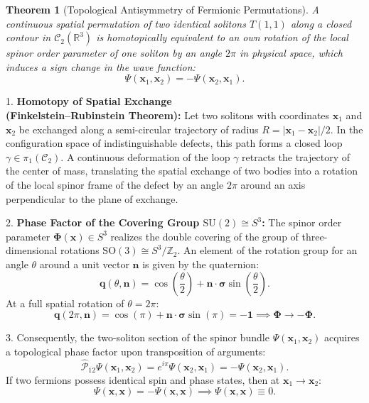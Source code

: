 \documentclass[12pt,a4paper]{article}
\newtheorem{theorem}{Theorem}
\newtheorem{corollary}{Corollary}
\begin{document}
	\begin{theorem}[Topological Antisymmetry of Fermionic Permutations]
	A continuous spatial permutation of two identical solitons $T(1,1)$ along a closed contour in $\mathcal{C}_2(\mathbb{R}^3)$ is homotopically equivalent to an own rotation of the local spinor order parameter of one soliton by an angle $2\pi$ in physical space, which induces a sign change in the wave function:
	\begin{equation}
	\Psi(\mathbf{x}_1, \mathbf{x}_2) = -\Psi(\mathbf{x}_2, \mathbf{x}_1).
	\end{equation}
	\end{theorem}
								
	1. \textbf{Homotopy of Spatial Exchange\\ (Finkelstein--Rubinstein Theorem):}
	Let two solitons with coordinates $\mathbf{x}_1$ and $\mathbf{x}_2$ be exchanged along a semi-circular trajectory of radius $R = |\mathbf{x}_1 - \mathbf{x}_2| / 2$. In the configuration space of indistinguishable defects, this path forms a closed loop $\gamma \in \pi_1(\mathcal{C}_2)$. 
	A continuous deformation of the loop $\gamma$ retracts the trajectory of the center of mass, translating the spatial exchange of two bodies into a rotation of the local spinor frame of the defect by an angle $2\pi$ around an axis perpendicular to the plane of exchange.
									
	2. \textbf{Phase Factor of the Covering Group $\mathrm{SU}(2) \cong S^3$:}
	The spinor order parameter $\boldsymbol{\Phi}(\mathbf{x}) \in S^3$ realizes the double covering of the group of three-dimensional rotations $\mathrm{SO}(3) \cong S^3 / \mathbb{Z}_2$. An element of the rotation group for an angle $\theta$ around a unit vector $\mathbf{n}$ is given by the quaternion:
	\begin{equation}
	\mathbf{q}(\theta, \mathbf{n}) = \cos\left(\frac{\theta}{2}\right) + \mathbf{n} \cdot \boldsymbol{\sigma} \sin\left(\frac{\theta}{2}\right).
	\end{equation}
	At a full spatial rotation of $\theta = 2\pi$:
	\begin{equation}
	\mathbf{q}(2\pi, \mathbf{n}) = \cos(\pi) + \mathbf{n} \cdot \boldsymbol{\sigma} \sin(\pi) = \mathbf{-1} \implies \boldsymbol{\Phi} \to -\boldsymbol{\Phi}.
	\end{equation}
									
	3. Consequently, the two-soliton section of the spinor bundle $\Psi(\mathbf{x}_1, \mathbf{x}_2)$ acquires a topological phase factor upon transposition of arguments:
	\begin{equation}
	\hat{\mathcal{P}}_{12} \Psi(\mathbf{x}_1, \mathbf{x}_2) = e^{i \pi} \Psi(\mathbf{x}_2, \mathbf{x}_1) = -\Psi(\mathbf{x}_2, \mathbf{x}_1).
	\end{equation}
	If two fermions possess identical spin and phase states, then at $\mathbf{x}_1 \to \mathbf{x}_2$:
	\begin{equation}
	\Psi(\mathbf{x}, \mathbf{x}) = -\Psi(\mathbf{x}, \mathbf{x}) \implies \Psi(\mathbf{x}, \mathbf{x}) \equiv 0.
	\end{equation}
									
\end{document}
